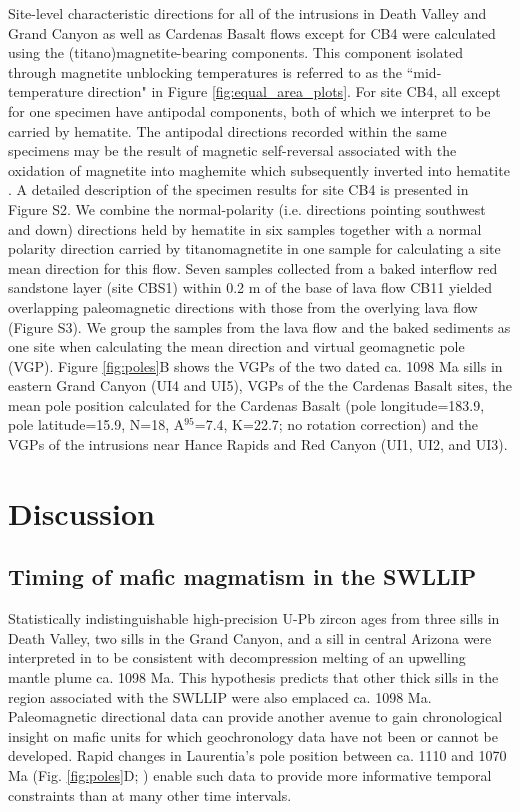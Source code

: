 Site-level characteristic directions for all of the intrusions in Death Valley and Grand Canyon as well as Cardenas Basalt flows except for CB4 were calculated using the (titano)magnetite-bearing components. This component isolated through magnetite unblocking temperatures is referred to as the ``mid-temperature direction" in Figure \ref{fig:equal_area_plots}. For site CB4, all except for one specimen have antipodal components, both of which we interpret to be carried by hematite. The antipodal directions recorded within the same specimens may be the result of magnetic self-reversal associated with the oxidation of magnetite into maghemite which subsequently inverted into hematite \citep{Swanson-Hysell2011a}. A detailed description of the specimen results for site CB4 is presented in Figure S2. We combine the normal-polarity (i.e. directions pointing southwest and down) directions held by hematite in six samples together with a normal polarity direction carried by titanomagnetite in one sample for calculating a site mean direction for this flow. Seven samples collected from a baked interflow red sandstone layer (site CBS1) within 0.2 m of the base of lava flow CB11 yielded overlapping paleomagnetic directions with those from the overlying lava flow (Figure S3). We group the samples from the lava flow and the baked sediments as one site when calculating the mean direction and virtual geomagnetic pole (VGP). Figure \ref{fig:poles}B shows the VGPs of the two dated ca. 1098 Ma sills in eastern Grand Canyon (UI4 and UI5), VGPs of the the Cardenas Basalt sites, the mean pole position calculated for the Cardenas Basalt (pole longitude=183.9\textdegree, pole latitude=15.9\textdegree, N=18, A$^{95}$=7.4\textdegree, K=22.7; no rotation correction) and the VGPs of the intrusions near Hance Rapids and Red Canyon (UI1, UI2, and UI3). 

\section*{Discussion}

\subsection*{Timing of mafic magmatism in the SWLLIP}

Statistically indistinguishable high-precision U-Pb zircon ages from three sills in Death Valley, two sills in the Grand Canyon, and a sill in central Arizona were interpreted in \cite{Mohr2024a} to be consistent with decompression melting of an upwelling mantle plume ca. 1098 Ma. This hypothesis predicts that other thick sills in the region associated with the SWLLIP were also emplaced ca. 1098 Ma. Paleomagnetic directional data can provide another avenue to gain chronological insight on mafic units for which geochronology data have not been or cannot be developed. Rapid changes in Laurentia's pole position between ca. 1110 and 1070 Ma (Fig. \ref{fig:poles}D; \citep{Swanson-Hysell2019a}) enable such data to provide more informative temporal constraints than at many other time intervals.

